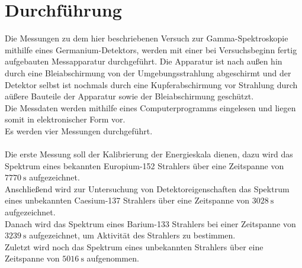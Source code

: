 \section{Durchführung}
\label{sec:Durchführung}
Die Messungen zu dem hier beschriebenen Versuch zur Gamma-Spektroskopie mithilfe eines Germanium-Detektors,
werden mit einer bei Versuchsbeginn fertig aufgebauten Messapparatur durchgeführt.
Die Apparatur ist nach außen hin durch eine Bleiabschirmung von der Umgebungsstrahlung abgeschirmt und der Detektor
selbst ist nochmals durch eine Kupferabschirmung vor Strahlung durch aüßere Bauteile der Apparatur sowie der
Bleiabschirmung geschützt.\\
Die Messdaten werden mithilfe eines Computerprogramms eingelesen und liegen somit in elektronischer Form vor.\\
Es werden vier Messungen durchgeführt.\\ \\
Die erste Messung soll der Kalibrierung der Energieskala dienen, dazu wird das Spektrum eines bekannten Europium-152
Strahlers über eine Zeitspanne von $\SI{7770}{\second}$ aufgezeichnet.\\
Anschließend wird zur Untersuchung von Detektoreigenschaften das Spektrum eines unbekannten Caesium-137 Strahlers
über eine Zeitspanne von $\SI{3028}{\second}$ aufgezeichnet.\\
Danach wird das Spektrum eines Barium-133 Strahlers bei einer Zeitspanne von $\SI{3239}{\second}$ aufgezeichnet, um
Aktivität des Strahlers zu bestimmen.\\
Zuletzt wird noch das Spektrum eines unbekannten Strahlers über eine Zeitspanne von $\SI{5016}{\second}$ aufgenommen.
